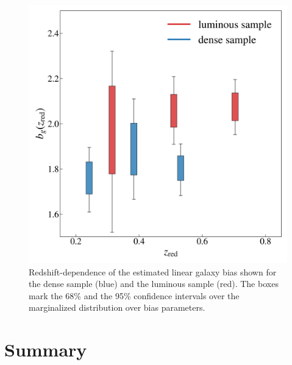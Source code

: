 \documentclass{aa}
\numberwithin{equation}{section}
\begin{document}

\begin{figure}
\includegraphics[width=\columnwidth]{figures_tmp/b_estimate_boxed.png}
\caption{ Redshift-dependence of the estimated linear galaxy bias shown for the dense sample (blue) and the luminous sample (red). The boxes mark the 68\% and the 95\% confidence intervals over the marginalized distribution over bias parameters.} 
\label{fig:b_estimate}
\end{figure}


\section{Summary}\label{sec:summary} 
\end{document}

